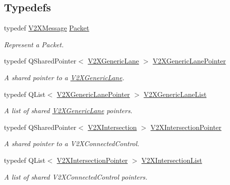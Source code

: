 \subsection*{Typedefs}
\begin{DoxyCompactItemize}
\item 
typedef \hyperlink{classV2XMessage}{V2\+X\+Message} \hyperlink{group__V2XFramework_ga1b82bfc289dbcb9aced56200d7abc964}{Packet}
\begin{DoxyCompactList}\small\item\em Represent a Packet. \end{DoxyCompactList}\item 
typedef Q\+Shared\+Pointer$<$ \hyperlink{classV2XGenericLane}{V2\+X\+Generic\+Lane} $>$ \hyperlink{group__V2XFramework_gac7bd4676a31eb2c991ddb08b45953f0c}{V2\+X\+Generic\+Lane\+Pointer}\hypertarget{group__V2XFramework_gac7bd4676a31eb2c991ddb08b45953f0c}{}\label{group__V2XFramework_gac7bd4676a31eb2c991ddb08b45953f0c}

\begin{DoxyCompactList}\small\item\em A shared pointer to a \hyperlink{classV2XGenericLane}{V2\+X\+Generic\+Lane}. \end{DoxyCompactList}\item 
typedef Q\+List$<$ \hyperlink{group__V2XFramework_gac7bd4676a31eb2c991ddb08b45953f0c}{V2\+X\+Generic\+Lane\+Pointer} $>$ \hyperlink{group__V2XFramework_ga3b5a1b36782fa633eee17b8081abc103}{V2\+X\+Generic\+Lane\+List}\hypertarget{group__V2XFramework_ga3b5a1b36782fa633eee17b8081abc103}{}\label{group__V2XFramework_ga3b5a1b36782fa633eee17b8081abc103}

\begin{DoxyCompactList}\small\item\em A list of shared \hyperlink{classV2XGenericLane}{V2\+X\+Generic\+Lane} pointers. \end{DoxyCompactList}\item 
typedef Q\+Shared\+Pointer$<$ \hyperlink{classV2XIntersection}{V2\+X\+Intersection} $>$ \hyperlink{group__V2XFramework_ga56fae412bb1a3173fc5009ac4ade2352}{V2\+X\+Intersection\+Pointer}\hypertarget{group__V2XFramework_ga56fae412bb1a3173fc5009ac4ade2352}{}\label{group__V2XFramework_ga56fae412bb1a3173fc5009ac4ade2352}

\begin{DoxyCompactList}\small\item\em A shared pointer to a V2\+X\+Connected\+Control. \end{DoxyCompactList}\item 
typedef Q\+List$<$ \hyperlink{group__V2XFramework_ga56fae412bb1a3173fc5009ac4ade2352}{V2\+X\+Intersection\+Pointer} $>$ \hyperlink{group__V2XFramework_ga22a1c07fac7df77efff8f0d4f6f3c248}{V2\+X\+Intersection\+List}\hypertarget{group__V2XFramework_ga22a1c07fac7df77efff8f0d4f6f3c248}{}\label{group__V2XFramework_ga22a1c07fac7df77efff8f0d4f6f3c248}

\begin{DoxyCompactList}\small\item\em A list of shared V2\+X\+Connected\+Control pointers. \end{DoxyCompactList}\end{DoxyCompactItemize}
